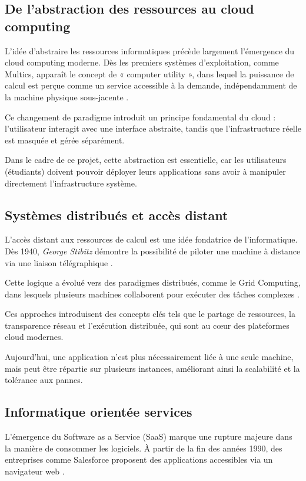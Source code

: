 \documentclass{rapportClass} %
\begin{document}
\subsection{De l'abstraction des ressources au cloud computing}

L'idée d'abstraire les ressources informatiques précède largement
l'émergence du cloud computing moderne. Dès les premiers systèmes
d'exploitation, comme Multics, apparaît le concept de « computer
utility », dans lequel la puissance de calcul est perçue comme un
service accessible à la demande, indépendamment de la machine
physique sous-jacente \cite{Multics1965}.

Ce changement de paradigme introduit un principe fondamental du cloud :
l'utilisateur interagit avec une interface abstraite, tandis que
l'infrastructure réelle est masquée et gérée séparément.

Dans le cadre de ce projet, cette abstraction est essentielle, car les
utilisateurs (étudiants) doivent pouvoir déployer leurs applications
sans avoir à manipuler directement l'infrastructure système.

\subsection{Systèmes distribués et accès distant}

L'accès distant aux ressources de calcul est une idée fondatrice de
l'informatique. Dès 1940, \textit{George Stibitz} démontre la possibilité
de piloter une machine à distance via une liaison télégraphique
\cite{Stibitz2012}.

Cette logique a évolué vers des paradigmes distribués, comme le Grid
Computing, dans lesquels plusieurs machines collaborent pour exécuter
des tâches complexes \cite{Foster2001}.

Ces approches introduisent des concepts clés tels que le partage de
ressources, la transparence réseau et l'exécution distribuée, qui sont
au cœur des plateformes cloud modernes.

Aujourd'hui, une application n'est plus nécessairement liée à une
seule machine, mais peut être répartie sur plusieurs instances,
améliorant ainsi la scalabilité et la tolérance aux pannes.

\subsection{Informatique orientée services}

L'émergence du Software as a Service (SaaS) marque une rupture majeure
dans la manière de consommer les logiciels. À partir de la fin des
années 1990, des entreprises comme Salesforce proposent des
applications accessibles via un navigateur web \cite{Salesforce1999}.
\end{document}
